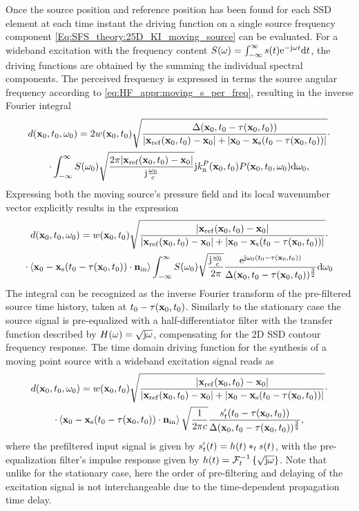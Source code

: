 Once the source position and reference position has been found for each SSD element at each time instant the driving function on a single source frequency component \eqref{Eq:SFS_theory:25D_KI_moving_source} can be evaluated.
For a wideband excitation with the frequency content $S(\omega) = \int_{-\infty}^{\infty} s(t) \mathrm{e}^{-\mathrm{j} \omega t} \mathrm{d} t$, the driving functions are obtained by the summing the individual spectral components.
The perceived frequency is expressed in terms the source angular frequency according to \eqref{eq:HF_appr:moving_s_per_freq}, resulting in the inverse Fourier integral
\begin{multline}
\small
d(\mathbf{x}_0,t_0,\omega_0) =2 w(\mathbf{x}_0,t_0) 
\sqrt{\frac{\Delta(\mathbf{x}_0,t_0-\tau(\mathbf{x}_0,t_0))}{|\mathbf{x}_{\mathrm{ref}}(\mathbf{x}_0,t_0)-\mathbf{x}_0|+|\mathbf{x}_0 - \mathbf{x}_{\mathrm{s}}(t_0-\tau(\mathbf{x}_0,t_0))|}}
\cdot \\ \cdot
 \int_{-\infty}^{\infty} S(\omega_0)
\sqrt{\frac{2\pi |\mathbf{x}_{\mathrm{ref}}(\mathbf{x}_0,t_0)-\mathbf{x}_0|}{\mathrm{j} \frac{\omega_0}{c} }}
\mathrm{j} k_{\mathrm{n}}^P(\mathbf{x}_0,t_0) P(\mathbf{x}_0,t_0,\omega_0) \mathrm{d} \omega_0,
\end{multline}
Expressing both the moving source's pressure field and its local wavenumber vector explicitly results in the expression
\begin{multline}
\small
d(\mathbf{x}_0,t_0,\omega_0) = w(\mathbf{x}_0,t_0) 
\sqrt{\frac{|\mathbf{x}_{\mathrm{ref}}(\mathbf{x}_0,t_0)-\mathbf{x}_0| }{|\mathbf{x}_{\mathrm{ref}}(\mathbf{x}_0,t_0)-\mathbf{x}_0|+|\mathbf{x}_0 - \mathbf{x}_{\mathrm{s}}(t_0-\tau(\mathbf{x}_0,t_0))|}}
\cdot \\ \cdot
\left< \mathbf{x}_0 -\mathbf{x}_{\mathrm{s}}(t_0-\tau(\mathbf{x}_0,t_0)) \cdot \mathbf{n}_{\mathrm{in}} \right>
\int_{-\infty}^{\infty} S(\omega_0)
\sqrt{\frac{\mathrm{j} \frac{\omega_0}{c}}{2\pi}}
\frac{\mathrm{e}^{\mathrm{j} \omega_0\left( t_0 - \tau( \mathbf{x}_0,t_0 )\right)}}{\Delta(\mathbf{x}_0,t_0-\tau( \mathbf{x}_0, t_0 ))^{\frac{3}{2}}}
 \mathrm{d} \omega_0
\end{multline}
The integral can be recognized as the inverse Fourier transform of the pre-filtered source time history, taken at $t_0 - \tau( \mathbf{x}_0,t_0 )$.
Similarly to the stationary case the source signal is pre-equalized with a half-differentiator filter with the transfer function described by $H(\omega) = \sqrt{\mathrm{j} \omega}$, compensating for the 2D SSD contour frequency response.
The time domain driving function for the synthesis of a moving point source with a wideband excitation signal reads as
\begin{multline}
\small
d(\mathbf{x}_0,t_0,\omega_0) = w(\mathbf{x}_0,t_0) 
\sqrt{\frac{|\mathbf{x}_{\mathrm{ref}}(\mathbf{x}_0,t_0)-\mathbf{x}_0| }{|\mathbf{x}_{\mathrm{ref}}(\mathbf{x}_0,t_0)-\mathbf{x}_0|+|\mathbf{x}_0 - \mathbf{x}_{\mathrm{s}}(t_0-\tau(\mathbf{x}_0,t_0))|}}
\cdot \\ \cdot
\left< \mathbf{x}_0 -\mathbf{x}_{\mathrm{s}}(t_0-\tau(\mathbf{x}_0,t_0)) \cdot \mathbf{n}_{\mathrm{in}} \right>
\sqrt{\frac{1}{2\pi c}}
\frac{ s^{\nshortmid}_t(t_0 - \tau( \mathbf{x}_0,t_0 )) }{\Delta(\mathbf{x}_0,t_0-\tau( \mathbf{x}_0, t_0 ))^{\frac{3}{2}}},
\label{Eq:Moving_source:25D_WFS}
\end{multline}
where the prefiltered input signal is given by $ s^{\nshortmid}_t(t) = h(t) \ast_{t} s(t)$, with the pre-equalization filter's impulse response given by $h(t) = \mathcal{F}^{-1}_t\left\{ \sqrt{\mathrm{j} \omega} \right\}$.
Note that unlike for the stationary case, here the order of pre-filtering and delaying of the excitation signal is not interchangeable due to the time-dependent propagation time delay.

